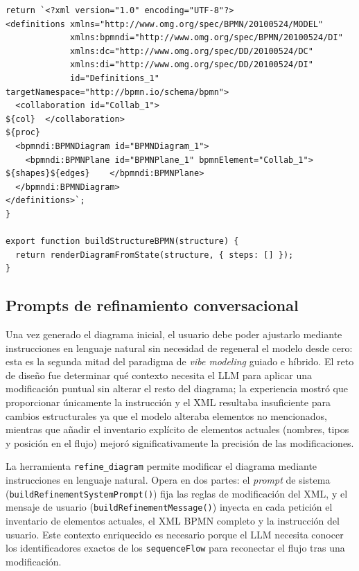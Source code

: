 \begin{lstlisting}[style=promptbox]
  return `<?xml version="1.0" encoding="UTF-8"?>
<definitions xmlns="http://www.omg.org/spec/BPMN/20100524/MODEL"
             xmlns:bpmndi="http://www.omg.org/spec/BPMN/20100524/DI"
             xmlns:dc="http://www.omg.org/spec/DD/20100524/DC"
             xmlns:di="http://www.omg.org/spec/DD/20100524/DI"
             id="Definitions_1" targetNamespace="http://bpmn.io/schema/bpmn">
  <collaboration id="Collab_1">
${col}  </collaboration>
${proc}
  <bpmndi:BPMNDiagram id="BPMNDiagram_1">
    <bpmndi:BPMNPlane id="BPMNPlane_1" bpmnElement="Collab_1">
${shapes}${edges}    </bpmndi:BPMNPlane>
  </bpmndi:BPMNDiagram>
</definitions>`;
}

export function buildStructureBPMN(structure) {
  return renderDiagramFromState(structure, { steps: [] });
}
\end{lstlisting}

\subsection{Prompts de refinamiento conversacional}
\label{subsec:promptRefinamiento}

Una vez generado el diagrama inicial, el usuario debe poder ajustarlo mediante instrucciones en lenguaje natural sin necesidad de regeneral el modelo desde cero: esta es la segunda mitad del paradigma de \textit{vibe modeling} guiado e híbrido. El reto de diseño fue determinar qué contexto necesita el LLM para aplicar una modificación puntual sin alterar el resto del diagrama; la experiencia mostró que proporcionar únicamente la instrucción y el XML resultaba insuficiente para cambios estructurales ya que el modelo alteraba elementos no mencionados, mientras que añadir el inventario explícito de elementos actuales (nombres, tipos y posición en el flujo) mejoró significativamente la precisión de las modificaciones. 


La herramienta \texttt{refine\_diagram} permite modificar el diagrama mediante instrucciones en lenguaje natural. Opera en dos partes: el \textit{prompt} de sistema (\texttt{buildRefinementSystemPrompt()}) fija las reglas de modificación del XML, y el mensaje de usuario (\texttt{buildRefinementMessage()}) inyecta en cada petición el inventario de elementos actuales, el XML BPMN completo y la instrucción del usuario. Este contexto enriquecido es necesario porque el LLM necesita conocer los identificadores exactos de los \texttt{sequenceFlow} para reconectar el flujo tras una modificación.


